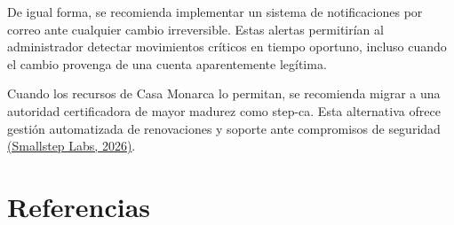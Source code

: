 \documentclass[10pt,letterpaper]{report}
\newcommand{\citeref}[2]{\hyperlink{ref:#1}{(#2)}}
\begin{document}
De igual forma, se recomienda implementar un sistema de notificaciones por correo ante cualquier cambio irreversible. Estas alertas permitirían al administrador detectar movimientos críticos en tiempo oportuno, incluso cuando el cambio provenga de una cuenta aparentemente legítima.

Cuando los recursos de Casa Monarca lo permitan, se recomienda migrar a una autoridad certificadora de mayor madurez como step-ca. Esta alternativa ofrece gestión automatizada de renovaciones y soporte ante compromisos de seguridad \citeref{smallstep2026}{Smallstep Labs, 2026}.

\chapter*{Referencias}

\begingroup
\small
\setlength{\parindent}{0pt}
\setlength{\parskip}{6pt}
\sloppy
\end{document}
